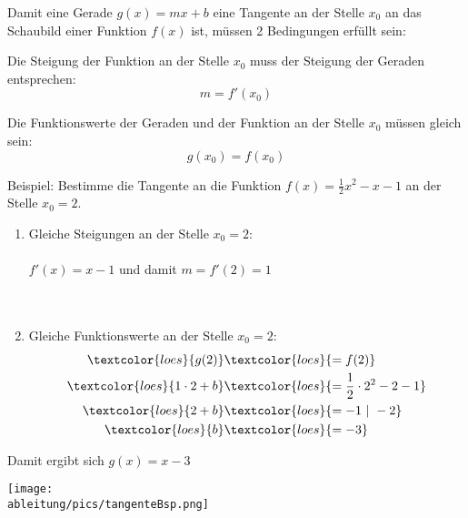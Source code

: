 Damit eine Gerade \(g(x)=mx+b\) eine Tangente an der Stelle \(x_0\) an das Schaubild einer Funktion \(f(x)\) ist, müssen 2 Bedingungen erfüllt sein:
\begin{tcolorbox}
	\textcolor{loestc}{Die Steigung der Funktion an der Stelle \(x_0\) muss der Steigung der Geraden entsprechen:
		\[m=f'(x_0)\]}
\end{tcolorbox}
\begin{tcolorbox}
	\textcolor{loestc}{Die Funktionswerte der Geraden und der Funktion an der Stelle \(x_0\) müssen gleich sein:
		\[g(x_0)=f(x_0)\]}
\end{tcolorbox}
Beispiel: Bestimme die Tangente an die Funktion \(f(x)=\frac{1}{2}x^2-x-1\) an der Stelle \(x_0=2\).\vspace{0.5cm}
\begin{minipage}{\textwidth}
	\begin{minipage}{0.5\textwidth}
		\begin{enumerate}
			\item Gleiche Steigungen an der Stelle \(x_0=2\):\\
			\\
			\textcolor{loes}{\(f'(x)=x-1\) und damit \(m=f'(2)=1\)}\\
			\\
			\\
			\item Gleiche Funktionswerte an der Stelle \(x_0=2\):\\
			\begin{align*}
				\textcolor{loes}{g(2)}&\textcolor{loes}{=f(2)}\\
				\textcolor{loes}{1\cdot 2+b}&\textcolor{loes}{=\frac{1}{2}\cdot 2^2-2-1}\\
				\textcolor{loes}{2+b}&\textcolor{loes}{=-1\ \vert\ -2}\\
				\textcolor{loes}{b}&\textcolor{loes}{=-3}
			\end{align*}
		\end{enumerate}
		\textcolor{loes}{Damit ergibt sich \(g(x)=x-3\)}
	\end{minipage}
	\begin{minipage}{0.5\textwidth}
		\centering\texttt{[image: \\ableitung/pics/tangenteBsp.png]}
	\end{minipage}
\end{minipage}\newpage
